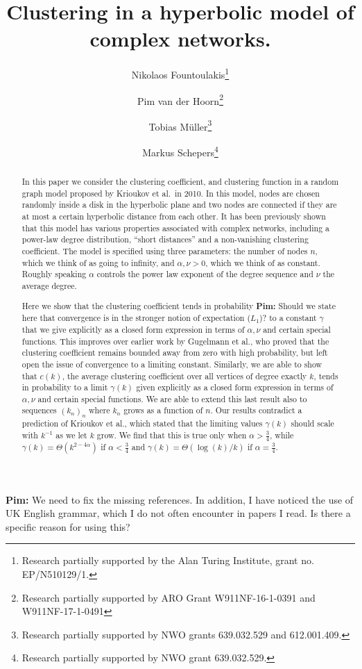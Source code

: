 \documentclass[a4paper,10pt]{article}
\title{Clustering in a hyperbolic model of complex networks.}
\author[1]{Nikolaos Fountoulakis\thanks{Research partially supported by the Alan Turing Institute, grant no. EP/N510129/1.}}
\author[2]{Pim van der Hoorn\thanks{Research partially supported by ARO Grant W911NF-16-1-0391 and W911NF-17-1-0491}}
\author[3]{Tobias M\"{u}ller\thanks{Research partially supported by NWO grants 639.032.529 and 612.001.409.}}
\author[3]{Markus Schepers\thanks{Research partially supported by NWO grant 639.032.529.}}
\affil[1]{ School of Mathematics, University of Birmingham, United Kingdom.}
\affil[2]{Department of Physics, Northeastern University, United States.}
\affil[3]{Bernoulli Institute, University of Groningen, The Netherlands.}
\newcommand{\1}{\mathds{1}}								%
\newcommand{\OR}[1]{{{\color{orange} #1}}}
\newcommand{\PvdH}[1]{{\OR{{\bf Pim:} #1}}}
\begin{document}
\maketitle

\begin{abstract}
In this paper we consider the clustering coefficient, and clustering function in a random graph model proposed by Krioukov et al.~in 2010. In this model, nodes are chosen randomly inside a disk in the hyperbolic plane and two nodes are connected if they are at most a certain hyperbolic distance from each other. It has been previously shown that this model has various properties associated with complex networks, including a power-law degree distribution, ``short distances'' and a non-vanishing clustering coefficient. The model is specified using three parameters: the number of nodes $n$, which we think of as going to infinity, and $\alpha, \nu > 0$, which we think of as constant. Roughly speaking $\alpha$ controls the power law exponent of the degree sequence and $\nu$ the average degree.

Here we show that the clustering coefficient tends in probability \PvdH{Should we state here that convergence is in the stronger notion of expectation ($L_1$)?} to a constant $\gamma$ that we give explicitly as a closed form expression in terms of $\alpha, \nu$ and certain special functions. This improves over earlier work by Gugelmann et al., who proved that the clustering coefficient remains bounded away from zero with high probability, but left open the issue of convergence to a limiting constant. Similarly, we are able to show that $c(k)$, the average clustering coefficient over all vertices of degree exactly $k$, tends in probability to a limit $\gamma(k)$ given explicitly as a closed form expression in terms of $\alpha, \nu$ and certain special functions. We are able to extend this last result also to sequences $(k_n)_n$ where $k_n$ grows as a function of $n$. Our results contradict a prediction of Krioukov et al., which stated that the limiting values $\gamma(k)$ should scale with $k^{-1}$ as we let $k$ grow. We find that this is true only when $\alpha > \frac34$, while $\gamma(k) = \Theta( k^{2 - 4\alpha})$ if $\alpha < \frac34$ and $\gamma(k) = \Theta( \log(k) / k )$ if $\alpha=\frac34$.
\end{abstract}

\newpage

\tableofcontents

\newpage

\PvdH{We need to fix the missing references. In addition, I have noticed the use of UK English grammar, which I do not often encounter in papers I read. Is there a specific reason for using this?}
\end{document}
